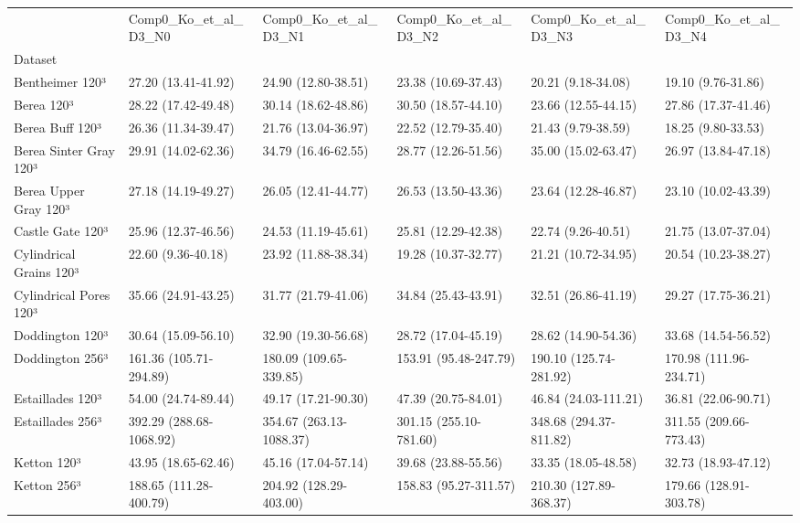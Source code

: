 \begin{tabular}{llllll}
\toprule
 & Comp0_Ko_et_al_D3_N0 & Comp0_Ko_et_al_D3_N1 & Comp0_Ko_et_al_D3_N2 & Comp0_Ko_et_al_D3_N3 & Comp0_Ko_et_al_D3_N4 \\
Dataset &  &  &  &  &  \\
\midrule
Bentheimer 120³ & 27.20 (13.41-41.92) & 24.90 (12.80-38.51) & 23.38 (10.69-37.43) & 20.21 (9.18-34.08) & 19.10 (9.76-31.86) \\
Berea 120³ & 28.22 (17.42-49.48) & 30.14 (18.62-48.86) & 30.50 (18.57-44.10) & 23.66 (12.55-44.15) & 27.86 (17.37-41.46) \\
Berea Buff 120³ & 26.36 (11.34-39.47) & 21.76 (13.04-36.97) & 22.52 (12.79-35.40) & 21.43 (9.79-38.59) & 18.25 (9.80-33.53) \\
Berea Sinter Gray 120³ & 29.91 (14.02-62.36) & 34.79 (16.46-62.55) & 28.77 (12.26-51.56) & 35.00 (15.02-63.47) & 26.97 (13.84-47.18) \\
Berea Upper Gray 120³ & 27.18 (14.19-49.27) & 26.05 (12.41-44.77) & 26.53 (13.50-43.36) & 23.64 (12.28-46.87) & 23.10 (10.02-43.39) \\
Castle Gate 120³ & 25.96 (12.37-46.56) & 24.53 (11.19-45.61) & 25.81 (12.29-42.38) & 22.74 (9.26-40.51) & 21.75 (13.07-37.04) \\
Cylindrical Grains 120³ & 22.60 (9.36-40.18) & 23.92 (11.88-38.34) & 19.28 (10.37-32.77) & 21.21 (10.72-34.95) & 20.54 (10.23-38.27) \\
Cylindrical Pores 120³ & 35.66 (24.91-43.25) & 31.77 (21.79-41.06) & 34.84 (25.43-43.91) & 32.51 (26.86-41.19) & 29.27 (17.75-36.21) \\
Doddington 120³ & 30.64 (15.09-56.10) & 32.90 (19.30-56.68) & 28.72 (17.04-45.19) & 28.62 (14.90-54.36) & 33.68 (14.54-56.52) \\
Doddington 256³ & 161.36 (105.71-294.89) & 180.09 (109.65-339.85) & 153.91 (95.48-247.79) & 190.10 (125.74-281.92) & 170.98 (111.96-234.71) \\
Estaillades 120³ & 54.00 (24.74-89.44) & 49.17 (17.21-90.30) & 47.39 (20.75-84.01) & 46.84 (24.03-111.21) & 36.81 (22.06-90.71) \\
Estaillades 256³ & 392.29 (288.68-1068.92) & 354.67 (263.13-1088.37) & 301.15 (255.10-781.60) & 348.68 (294.37-811.82) & 311.55 (209.66-773.43) \\
Ketton 120³ & 43.95 (18.65-62.46) & 45.16 (17.04-57.14) & 39.68 (23.88-55.56) & 33.35 (18.05-48.58) & 32.73 (18.93-47.12) \\
Ketton 256³ & 188.65 (111.28-400.79) & 204.92 (128.29-403.00) & 158.83 (95.27-311.57) & 210.30 (127.89-368.37) & 179.66 (128.91-303.78) \\

\end{tabular}
